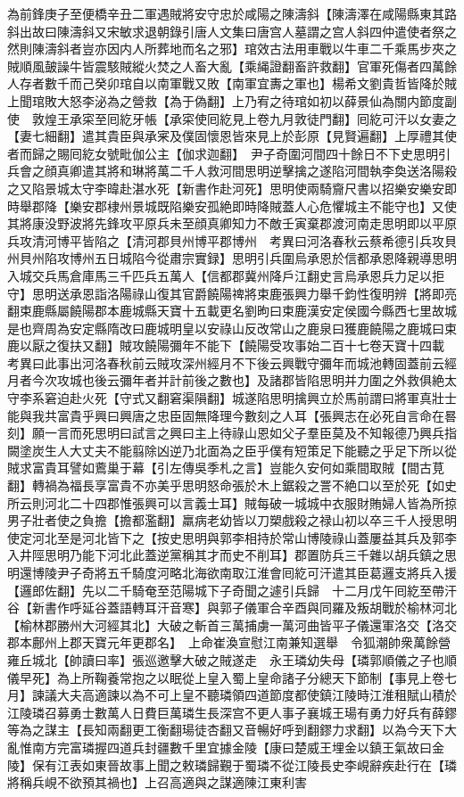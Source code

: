 為前鋒庚子至便橋辛丑二軍遇賊將安守忠於咸陽之陳濤斜【陳濤澤在咸陽縣東其路斜出故曰陳濤斜又宋敏求退朝錄引唐人文集曰唐宫人墓謂之宫人斜四仲遣使者祭之然則陳濤斜者豈亦因内人所葬地而名之邪】琯效古法用車戰以牛車二千乘馬步夾之賊順風皷譟牛皆震駭賊縱火焚之人畜大亂【乘䋲證翻畜許救翻】官軍死傷者四萬餘人存者數千而己癸卯琯自以南軍戰又敗【南軍宜夀之軍也】楊希文劉貴哲皆降於賊上聞琯敗大怒李泌為之營救【為于偽翻】上乃宥之待琯如初以薛景仙為關内節度副使　敦煌王承寀至囘紇牙帳【承寀使囘紇見上卷九月敦徒門翻】囘紇可汗以女妻之【妻七細翻】遣其貴臣與承宷及僕固懷恩皆來見上於彭原【見賢遍翻】上厚禮其使者而歸之賜囘紇女號毗伽公主【伽求迦翻】　尹子奇圍河間四十餘日不下史思明引兵會之顔真卿遣其將和琳將萬二千人救河間思明逆擊擒之遂陷河間執李奐送洛陽殺之又陷景城太守李暐赴湛水死【新書作赴河死】思明使兩騎齎尺書以招樂安樂安即時舉郡降【樂安郡棣州景城既陷樂安孤絶即時降賊蓋人心危懼城主不能守也】又使其將康没野波將先鋒攻平原兵未至顔真卿知力不敵壬寅棄郡渡河南走思明即以平原兵攻清河博平皆陷之【清河郡貝州博平郡博州　考異曰河洛春秋云蔡希德引兵攻貝州貝州陷攻博州五日城陷今從肅宗實録】思明引兵圍烏承恩於信都承恩降親導思明入城交兵馬倉庫馬三千匹兵五萬人【信都郡冀州降戶江翻史言烏承恩兵力足以拒守】思明送承恩詣洛陽祿山復其官爵饒陽禆將束鹿張興力舉千鈞性復明辨【將即亮翻束鹿縣屬饒陽郡本鹿城縣天寶十五載更名劉昫曰束鹿漢安定侯國今縣西七里故城是也齊周為安定縣隋改曰鹿城明皇以安祿山反改常山之鹿泉曰獲鹿饒陽之鹿城曰束鹿以厭之復扶又翻】賊攻饒陽彌年不能下【饒陽受攻事始二百十七卷天寶十四載　考異曰此事出河洛春秋前云賊攻深州經月不下後云興戰守彌年而城池轉固蓋前云經月者今次攻城也後云彌年者并計前後之數也】及諸郡皆陷思明并力圍之外救俱絶太守李系窘迫赴火死【守式又翻窘渠隕翻】城遂陷思明擒興立於馬前謂曰將軍真壯士能與我共富貴乎興曰興唐之忠臣固無降理今數刻之人耳【張興志在必死自言命在晷刻】願一言而死思明曰試言之興曰主上待祿山恩如父子羣臣莫及不知報德乃興兵指闕塗炭生人大丈夫不能翦除凶逆乃北面為之臣乎僕有短策足下能聽之乎足下所以從賊求富貴耳譬如鷰巢于幕【引左傳吳季札之言】豈能久安何如乘間取賊【間古莧翻】轉禍為福長享富貴不亦美乎思明怒命張於木上鋸殺之詈不絶口以至於死【如史所云則河北二十四郡惟張興可以言義士耳】賊每破一城城中衣服財賄婦人皆為所掠男子壯者使之負擔【擔都濫翻】羸病老幼皆以刀槊戲殺之禄山初以卒三千人授思明使定河北至是河北皆下之【按史思明與郭李相持於常山博陵祿山蓋屢益其兵及郭李入井陘思明乃能下河北此蓋逆黨稱其才而史不削耳】郡置防兵三千雜以胡兵鎮之思明還博陵尹子奇將五千騎度河略北海欲南取江淮會囘紇可汗遣其臣葛邏支將兵入援【邏郎佐翻】先以二千騎奄至范陽城下子奇聞之遽引兵歸　十二月戊午囘紇至帶汗谷【新書作呼延谷蓋語轉耳汗音寒】與郭子儀軍合辛酉與同羅及叛胡戰於榆林河北【榆林郡勝州大河經其北】大破之斬首三萬捕虜一萬河曲皆平子儀還軍洛交【洛交郡本鄜州上郡天寶元年更郡名】　上命崔渙宣慰江南兼知選舉　令狐潮帥衆萬餘營雍丘城北【帥讀曰率】張巡邀擊大破之賊遂走　永王璘幼失母【璘郭順儀之子也順儀早死】為上所鞠養常抱之以眠從上皇入蜀上皇命諸子分總天下節制【事見上卷七月】諫議大夫高適諫以為不可上皇不聽璘領四道節度都使鎮江陵時江淮租賦山積於江陵璘召募勇士數萬人日費巨萬璘生長深宫不更人事子襄城王瑒有勇力好兵有薛鏐等為之謀主【長知兩翻更工衡翻瑒徒杏翻又音暢好呼到翻鏐力求翻】以為今天下大亂惟南方完富璘握四道兵封疆數千里宜據金陵【康曰楚威王埋金以鎮王氣故曰金陵】保有江表如東晉故事上聞之敕璘歸覲于蜀璘不從江陵長史李峴辭疾赴行在【璘將稱兵峴不欲預其禍也】上召高適與之謀適陳江東利害